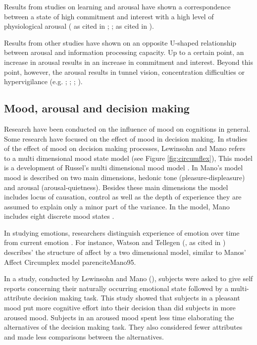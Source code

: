 \documentclass[jou,draftfirst,11pt]{apa6}
\begin{document}
Results from studies on learning and arousal have shown a
correspondence between a state of high commitment and interest with a
high level of physiological arousal (\cite{Berlyne60} as cited in
\cite{Izard77}; \cite{Berlyne67}; as cited in \cite{Izard77}).

Results from other studies have shown on an opposite U-shaped
relationship between arousal and information processing capacity.  Up
to a certain point, an increase in arousal results in an increase in
commitment and interest.  Beyond this point, however, the arousal
results in tunnel vision, concentration difficulties or hypervigilance
(e.g. \cite{Easterbrook59}; \cite{JanisMann77}; \cite{LewinsohnMano93};
\cite{StoneKadous94}).



\subsection{Mood, arousal and decision making}

Research have been conducted on the influence of mood on cognitions in
general.  Some research have focused on the effect of mood in decision
making.  In studies of the effect of mood on decision making
processes, Lewinsohn and Mano refers to a multi dimensional mood state
model \parencite{LewinsohnMano93, Mano94} (see Figure
\ref{fig:circumflex}), This model
is a development of Russel's multi dimensional mood model
\parencite{Russel78}. In Mano's model mood is described on two main dimensions,
hedonic tone (pleasure-displeasure) and arousal (arousal-quietness).
Besides these main dimensions the model includes locus of causation,
control as well as the depth of experience they are assumed to explain
only a minor part of the variance.  In the model, Mano includes eight
discrete mood states \parencite{Mano94}.







In studying emotions, researchers distinguish experience of emotion
over time from current emotion \parencite{FiskeTaylor91}. For instance,
Watson and Tellegen (\cite{WatsonTellegen85}, as cited in \cite{FiskeTaylor91})
describes' the structure of affect by a two dimensional model, similar
to Manos' Affect Circumplex model parencite{Mano95}.

In a study, conducted by Lewinsohn and Mano
(\citeyear{LewinsohnMano93}), subjects were asked to give self reports
concerning their naturally occurring emotional state followed by a
multi-attribute decision making task. This study showed that subjects
in a pleasant mood put more cognitive effort into their decision than
did subjects in more aroused mood. Subjects in an aroused mood spent
less time elaborating the alternatives of the decision making task.
They also considered fewer attributes and made less comparisons
between the alternatives.
\end{document}
